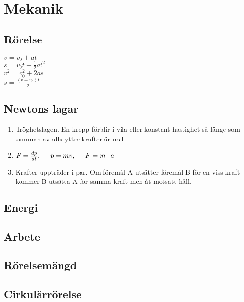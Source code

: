 \section{Mekanik}

\subsection{Rörelse}
    \begin{math}
        v = v_0 + at
    \end{math} \\[2pt]
    \begin{math}
        s = v_0 t + \frac{1}{2} at^2
    \end{math} \\[2pt]
    \begin{math}
        v^2 = v_0^2 + 2as
    \end{math} \\[2pt]
    \begin{math}
        s = \frac{(v + v_0)t}{2}
    \end{math} \\[2pt]

\subsection{Newtons lagar}
\begin{enumerate}
    \item
        Tröghetslagen. En kropp förblir i vila eller konstant hastighet så länge som summan av alla yttre krafter är noll.
    \item
        \begin{math}
            F = \frac{dp}{dt}, \hspace*{0.5cm} p = mv, \hspace*{0.5cm} F = m \cdot a
        \end{math} \\[2pt]
    \item
        Krafter uppträder i par. Om föremål A utsätter föremål B för en viss kraft kommer B utsätta A för samma kraft men åt motsatt håll.
\end{enumerate}

\subsection{Energi}

\subsection{Arbete}

\subsection{Rörelsemängd}

\subsection{Cirkulärrörelse}
